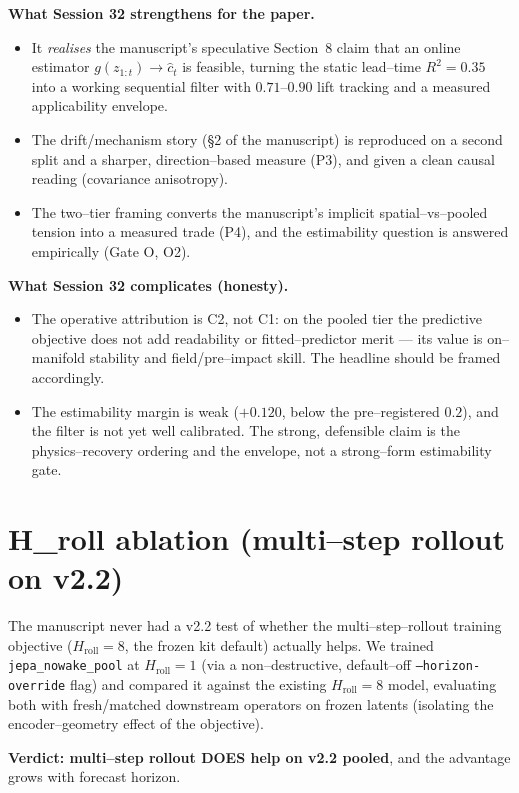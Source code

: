 \documentclass[11pt]{article}
\begin{document}
\textbf{What Session 32 strengthens for the paper.}
\begin{itemize}[leftmargin=1.4em,itemsep=1pt]
\item It \emph{realises} the manuscript's speculative Section~8 claim that an online estimator
$g(z_{1:t})\to\hat c_t$ is feasible, turning the static lead--time $R^2{=}0.35$ into a working
sequential filter with $0.71$--$0.90$ lift tracking and a measured applicability envelope.
\item The drift/mechanism story (\S2 of the manuscript) is reproduced on a second split and a
sharper, direction--based measure (P3), and given a clean causal reading (covariance anisotropy).
\item The two--tier framing converts the manuscript's implicit spatial--vs--pooled tension into
a measured trade (P4), and the estimability question is answered empirically (Gate O, O2).
\end{itemize}

\textbf{What Session 32 complicates (honesty).}
\begin{itemize}[leftmargin=1.4em,itemsep=1pt]
\item The operative attribution is C2, not C1: on the pooled tier the predictive objective does
not add readability or fitted--predictor merit --- its value is on--manifold stability and
field/pre--impact skill. The headline should be framed accordingly.
\item The estimability margin is weak ($+0.120$, below the pre--registered $0.2$), and the filter
is not yet well calibrated. The strong, defensible claim is the physics--recovery ordering and the
envelope, not a strong--form estimability gate.
\end{itemize}

\section{H\_roll ablation (multi--step rollout on v2.2)}
The manuscript never had a v2.2 test of whether the multi--step--rollout training objective
($H_{\text{roll}}{=}8$, the frozen kit default) actually helps. We trained \texttt{jepa\_nowake\_pool}
at $H_{\text{roll}}{=}1$ (via a non--destructive, default--off \texttt{--horizon-override} flag)
and compared it against the existing $H_{\text{roll}}{=}8$ model, evaluating both with fresh/matched
downstream operators on frozen latents (isolating the encoder--geometry effect of the objective).

\textbf{Verdict: multi--step rollout DOES help on v2.2 pooled}, and the advantage grows with
forecast horizon.
\end{document}

